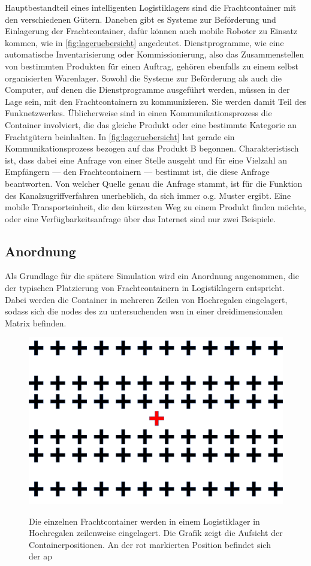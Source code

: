 Hauptbestandteil eines intelligenten Logistiklagers sind die Frachtcontainer mit den verschiedenen Gütern. Daneben gibt es Systeme zur Beförderung und Einlagerung der Frachtcontainer, dafür können auch mobile Roboter zu Einsatz kommen, wie in \autoref{fig:lageruebersicht} angedeutet. Dienstprogramme, wie eine automatische Inventarisierung oder Kommissionierung, also das Zusammenstellen von bestimmten Produkten für einen Auftrag, gehören ebenfalls zu  einem selbst organisierten Warenlager. Sowohl die Systeme zur Beförderung als auch die Computer, auf denen die Dienstprogramme ausgeführt werden, müssen in der Lage sein, mit den Frachtcontainern zu kommunizieren. Sie werden damit Teil des Funknetzwerkes. Üblicherweise sind in einen Kommunikationsprozess die Container involviert, die das gleiche Produkt oder eine bestimmte Kategorie an Frachtgütern beinhalten. In \autoref{fig:lageruebersicht} hat \zB gerade ein Kommunikationsprozess bezogen auf das Produkt B begonnen. Charakteristisch ist, dass dabei eine Anfrage von einer Stelle ausgeht und für eine Vielzahl an Empfängern --- den Frachtcontainern --- bestimmt ist, die diese Anfrage beantworten. Von welcher Quelle genau die Anfrage stammt, ist für die Funktion des Kanalzugriffverfahren unerheblich, da sich immer o.g. Muster ergibt. Eine mobile Transporteinheit, die den kürzesten Weg zu einem Produkt finden möchte, oder eine Verfügbarkeitsanfrage über das Internet sind nur zwei Beispiele.

\subsection{Anordnung}
Als Grundlage für die spätere Simulation wird ein Anordnung angenommen, die der typischen Platzierung von Frachtcontainern in Logistiklagern entspricht. Dabei werden die Container in mehreren Zeilen von Hochregalen eingelagert, sodass sich die \glspl{node} des zu untersuchenden \ac{wsn} in einer dreidimensionalen Matrix befinden. 

\begin{figure}[bth]
        \myfloatalign
        {\includegraphics[width=0.5\linewidth]{gfx/anordnung}} 
        \caption[Anordnung von Frachtcontainern in einem Logistiklager]{Die einzelnen Frachtcontainer werden in einem Logistiklager in Hochregalen zeilenweise eingelagert. Die Grafik zeigt die Aufsicht der Containerpositionen. An der rot markierten Position befindet sich der \acs{ap}}\label{fig:lager}
\end{figure}

